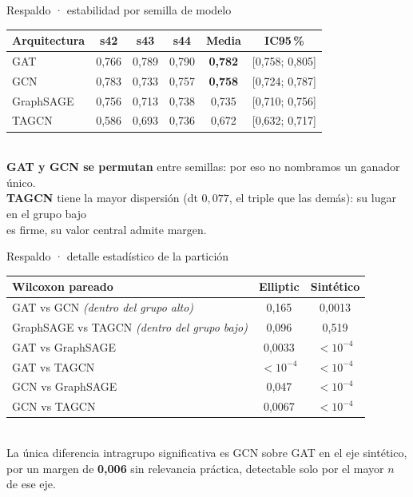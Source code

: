 \documentclass[aspectratio=169,10pt]{beamer}
\begin{document}
\begin{frame}{Respaldo · estabilidad por semilla de modelo}
\begin{center}
\small
\renewcommand{\arraystretch}{1.3}
\begin{tabular}{lccccc}
\toprule
\textbf{Arquitectura} & \textbf{s42} & \textbf{s43} & \textbf{s44} & \textbf{Media} & \textbf{IC95\,\%} \\
\midrule
GAT       & 0,766 & 0,789 & 0,790 & \textbf{0,782} & [0,758; 0,805] \\
GCN       & 0,783 & 0,733 & 0,757 & \textbf{0,758} & [0,724; 0,787] \\
GraphSAGE & 0,756 & 0,713 & 0,738 & 0,735 & [0,710; 0,756] \\
TAGCN     & 0,586 & 0,693 & 0,736 & 0,672 & [0,632; 0,717] \\
\bottomrule
\end{tabular}
\\[9pt]
\footnotesize
\textbf{GAT y GCN se permutan} entre semillas: por eso no nombramos un ganador único.\\
\textbf{TAGCN} tiene la mayor dispersión (dt $0{,}077$, el triple que las demás): su lugar en el grupo bajo\\es firme, su valor central admite margen.
\end{center}
\end{frame}

\begin{frame}{Respaldo · detalle estadístico de la partición}
\begin{center}
\footnotesize
\renewcommand{\arraystretch}{1.25}
\begin{tabular}{lcc}
\toprule
\textbf{Wilcoxon pareado} & \textbf{Elliptic} & \textbf{Sintético} \\
\midrule
GAT vs GCN \hfill \textit{(dentro del grupo alto)} & 0,165 & 0,0013 \\
GraphSAGE vs TAGCN \hfill \textit{(dentro del grupo bajo)} & 0,096 & 0,519 \\
\midrule
GAT vs GraphSAGE & 0,0033 & $<10^{-4}$ \\
GAT vs TAGCN & $<10^{-4}$ & $<10^{-4}$ \\
GCN vs GraphSAGE & 0,047 & $<10^{-4}$ \\
GCN vs TAGCN & 0,0067 & $<10^{-4}$ \\
\bottomrule
\end{tabular}
\\[8pt]
\footnotesize
La única diferencia intragrupo significativa es GCN sobre GAT en el eje sintético,\\
por un margen de \textbf{0,006} sin relevancia práctica, detectable solo por el mayor $n$ de ese eje.
\end{center}
\end{frame}
\end{document}
